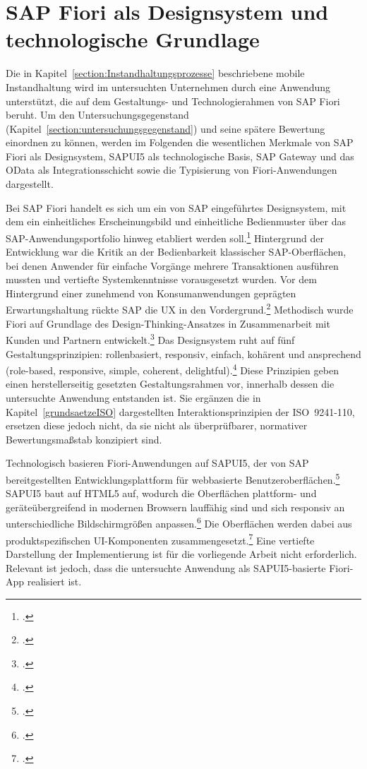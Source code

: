 \section{SAP Fiori als Designsystem und technologische Grundlage}
\label{section:fiori}

Die in Kapitel~\ref{section:Instandhaltungsprozesse} beschriebene mobile Instandhaltung wird
im untersuchten Unternehmen durch eine Anwendung unterstützt, die auf dem
Gestaltungs- und Technologierahmen von SAP Fiori beruht. Um den
Untersuchungsgegenstand (Kapitel~\ref{section:untersuchungsgegenstand}) und seine
spätere Bewertung einordnen zu können, werden im Folgenden die wesentlichen
Merkmale von SAP Fiori als Designsystem, \ac{SAPUI5} als
technologische Basis, SAP Gateway und das \ac{OData} als Integrationsschicht
sowie die Typisierung von Fiori-Anwendungen dargestellt.

Bei SAP Fiori handelt es sich um ein von SAP eingeführtes Designsystem, mit dem ein
einheitliches Erscheinungsbild und einheitliche Bedienmuster über das
SAP-Anwendungsportfolio hinweg etabliert werden
soll.\footcite[Vgl.][S.~1]{mathew_2015} Hintergrund der Entwicklung war die
Kritik an der Bedienbarkeit klassischer SAP-Oberflächen, bei denen Anwender für
einfache Vorgänge mehrere Transaktionen ausführen mussten und vertiefte
Systemkenntnisse vorausgesetzt wurden. Vor dem Hintergrund einer zunehmend von
Konsumanwendungen geprägten Erwartungshaltung rückte SAP die \ac{UX} in den
Vordergrund.\footcite[Vgl.][S.~3]{mathew_2015} Methodisch wurde Fiori auf
Grundlage des Design-Thinking-Ansatzes in Zusammenarbeit mit Kunden und Partnern
entwickelt.\footcite[Vgl.][S.~5]{szirtes_rivlin_2016} Das Designsystem ruht auf
fünf Gestaltungsprinzipien: rollenbasiert, responsiv, einfach, kohärent und
ansprechend (role-based, responsive, simple, coherent,
delightful).\footcites[Vgl.][S.~13~f.]{mathew_2015}[Vgl.][S.~5]{szirtes_rivlin_2016}
Diese Prinzipien geben einen herstellerseitig gesetzten Gestaltungsrahmen vor,
innerhalb dessen die untersuchte Anwendung entstanden ist. Sie ergänzen die in
Kapitel~\ref{grundsaetzeISO} dargestellten Interaktionsprinzipien der
ISO~9241-110, ersetzen diese jedoch nicht, da sie nicht als überprüfbarer,
normativer Bewertungsmaßstab konzipiert sind.

Technologisch basieren Fiori-Anwendungen auf SAPUI5, der von SAP bereitgestellten
Entwicklungsplattform für webbasierte
Benutzeroberflächen.\footcite[Vgl.][S.~6]{szirtes_rivlin_2016} SAPUI5 baut auf
\ac{HTML5} auf, wodurch die Oberflächen plattform- und geräteübergreifend in modernen
Browsern lauffähig sind und sich responsiv an unterschiedliche Bildschirmgrößen
anpassen.\footcite[Vgl.][S.~13]{mathew_2015} Die Oberflächen werden dabei aus produktspezifischen \ac{UI}-Komponenten
zusammengesetzt.\footcite[Vgl.][S.~20]{mathew_2015} Eine vertiefte Darstellung der
Implementierung ist für die vorliegende Arbeit nicht erforderlich. Relevant ist jedoch,
dass die untersuchte Anwendung als SAPUI5-basierte Fiori-App realisiert ist.

